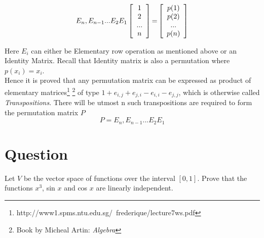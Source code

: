\documentclass[12pt]{article}
\newcommand\tab[1][1cm]{\hspace*{#1}}
\begin{document}
\[ \textnormal{$E_n,E_{n-1}...E_2E_1$}
\left[ \begin{array}{cc}
  1 \\
  2 \\
  ... \\
  n \\
\end{array} \right]
\textnormal{=}
\left[ \begin{array}{cc}
  p(1) \\
  p(2) \\
  ... \\
  p(n) \\
\end{array} \right]
\]

Here $E_i$ can either be Elementary row operation as mentioned above or an Identity Matrix. Recall that Identity matrix is also a permutation where $p(x_i) = x_i$. \\

\noindent
\tab Hence it is proved that any permutation matrix can be expressed as product of elementary matrices\footnote{http://www1.spms.ntu.edu.sg/~frederique/lecture7ws.pdf} \footnote{ Book by Micheal Artin: \textit{Algebra}} of type $1+e_{i,j}+e_{j,i}-e_{i,i}-e_{j,j}$, which is otherwise called \textit{Transpositions}. There will be utmost n such transpositions are required to form the permutation matrix $P$ 
$$
P = E_n,E_{n-1}...E_2E_1
$$
\clearpage
\section{Question}
Let $V$ be the vector space of functions over the interval $[0, 1]$. Prove that the functions $x^3$, sin $x$ and cos $x$ are linearly independent.
\end{document}
